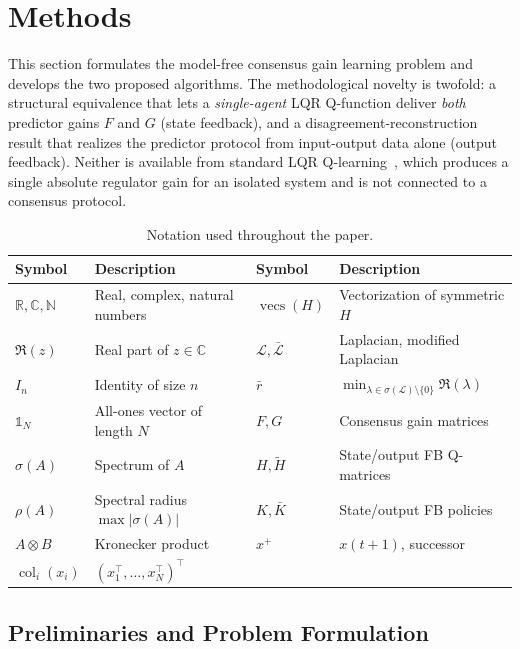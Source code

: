 \documentclass[12pt]{elsarticle}
\theoremstyle{remark}
\DeclareMathOperator{\col}{col}
\DeclareMathOperator{\vecs}{vecs}
\newcommand{\R}{\mathbb{R}}
\newcommand{\N}{\mathbb{N}}
\newcommand{\C}{\mathbb{C}}
\newcommand{\ones}{\mathbb{1}}
\begin{document}
\section{Methods}
\label{sec:methods}

This section formulates the model-free consensus gain learning problem and develops the two proposed algorithms. The methodological novelty is twofold: a structural equivalence that lets a \emph{single-agent} LQR Q-function deliver \emph{both} predictor gains $F$ and $G$ (state feedback), and a disagreement-reconstruction result that realizes the predictor protocol from input-output data alone (output feedback). Neither is available from standard LQR Q-learning~\cite{bradtke1994,lewis2009,rizvi2022}, which produces a single absolute regulator gain for an isolated system and is not connected to a consensus protocol.

\begin{table}[htbp]
\centering
\caption{Notation used throughout the paper.}
\label{tab:notation}
\footnotesize
\setlength{\tabcolsep}{4pt}
\begin{tabular}{@{}llll@{}}
\toprule
\textbf{Symbol} & \textbf{Description} & \textbf{Symbol} & \textbf{Description} \\
\midrule
$\R,\C,\N$ & Real, complex, natural numbers & $\vecs(H)$ & Vectorization of symmetric $H$ \\
$\Re(z)$ & Real part of $z \in \C$ & $\mathcal{L},\bar{\mathcal{L}}$ & Laplacian, modified Laplacian \\
$I_n$ & Identity of size $n$ & $\bar{r}$ & $\min_{\lambda \in \sigma(\mathcal{L})\setminus\{0\}} \Re(\lambda)$ \\
$\ones_N$ & All-ones vector of length $N$ & $F,G$ & Consensus gain matrices \\
$\sigma(A)$ & Spectrum of $A$ & $H,\tilde{H}$ & State/output FB Q-matrices \\
$\rho(A)$ & Spectral radius $\max|\sigma(A)|$ & $K,\bar{K}$ & State/output FB policies \\
$A \otimes B$ & Kronecker product & $x^+$ & $x(t{+}1)$, successor \\
$\col_{i}(x_i)$ & $(x_1^\top,\ldots,x_N^\top)^\top$ & & \\
\bottomrule
\end{tabular}
\end{table}

\subsection{Preliminaries and Problem Formulation}
\label{subsec:prelim}
\end{document}
